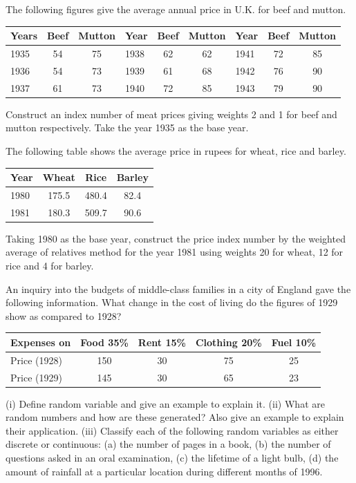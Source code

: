 \documentclass[11pt,a4paper]{article}
\begin{document}
\begin{longlist}
\item The following figures give the average annual price in U.K. for beef and mutton.
\begin{center}
\begin{tabular}{l cc l cc l cc}
\toprule
Years & Beef & Mutton & Year & Beef & Mutton & Year & Beef & Mutton \\
\midrule
1935 & 54 & 75 & 1938 & 62 & 62 & 1941 & 72 & 85 \\
1936 & 54 & 73 & 1939 & 61 & 68 & 1942 & 76 & 90 \\
1937 & 61 & 73 & 1940 & 72 & 85 & 1943 & 79 & 90 \\
\bottomrule
\end{tabular}
\end{center}
Construct an index number of meat prices giving weights 2 and 1 for beef and mutton respectively. Take the year 1935 as the base year.

\item The following table shows the average price in rupees for wheat, rice and barley.
\begin{center}
\begin{tabular}{l ccc}
\toprule
Year & Wheat & Rice & Barley \\
\midrule
1980 & 175.5 & 480.4 & 82.4 \\
1981 & 180.3 & 509.7 & 90.6 \\
\bottomrule
\end{tabular}
\end{center}
Taking 1980 as the base year, construct the price index number by the weighted average of relatives method for the year 1981 using weights 20 for wheat, 12 for rice and 4 for barley.

\item An inquiry into the budgets of middle-class families in a city of England gave the following information. What change in the cost of living do the figures of 1929 show as compared to 1928?
\begin{center}
\begin{tabular}{l cccc}
\toprule
Expenses on & Food 35\% & Rent 15\% & Clothing 20\% & Fuel 10\% \\
\midrule
Price (1928) & 150 & 30 & 75 & 25 \\
Price (1929) & 145 & 30 & 65 & 23 \\
\bottomrule
\end{tabular}
\end{center}

\item (i) Define random variable and give an example to explain it. (ii) What are random numbers and how are these generated? Also give an example to explain their application. (iii) Classify each of the following random variables as either discrete or continuous: (a) the number of pages in a book, (b) the number of questions asked in an oral examination, (c) the lifetime of a light bulb, (d) the amount of rainfall at a particular location during different months of 1996.


\end{longlist}
\end{document}
